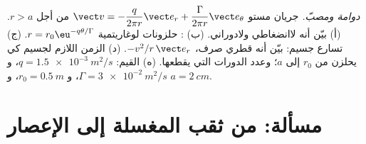 \begin{exercise}[$\star\star\star$]\label{exo:b2:fluid-kinematics:12}
\emph{دوامة ومصبّ.} جريان مستو $\vect v = -\dfrac{q}{2\pi r}\vect e_r +
\dfrac{\Gamma}{2\pi r}\vect e_\theta$ من أجل $r > a$. (أ) بيّن أنه
لاانضغاطي ولادوراني. (ب) : حلزونات لوغاريتمية
$r = r_0\eu^{-q\theta/\Gamma}$. (ج) تسارع جسيم: بيّن أنه قطري صرف،
$-v^2/r\,\vect e_r$. (د) الزمن اللازم لجسيم كي يحلزن من $r_0$ إلى $a$؛
وعدد الدورات التي يقطعها. (ه) القيم: $q =
\qty{1.5e-3}{m^2/s}$، و $\Gamma = \qty{3e-2}{m^2/s}$، و $r_0 = \qty{0.5}{m}$،
و $a = \qty{2}{cm}$.
\end{exercise}

\section{مسألة: من ثقب المغسلة إلى الإعصار}

